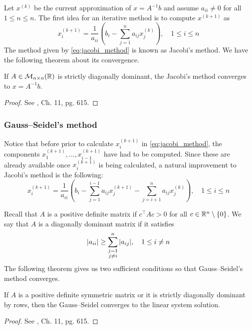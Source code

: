 Let $x^{(k)}$ be the current approximation of $x = A^{-1} b$ and assume $a_{ii}
\neq 0$ for all $1 \leq n \leq n$. The first idea for an iterative method is to
compute $x^{(k+1)}$ as
\begin{equation} \label{eq:jacobi_method}
    x_i^{(k+1)} = 
    \frac{1}{a_{ii}} \left( b_i - \sum_{j=1}^n a_{ij} x_j^{(k)} \right), 
    \quad 1 \leq i \leq n
\end{equation}
The method given by \eqref{eq:jacobi_method} is known as Jacobi's method. We
have the following theorem about its convergence.

\begin{theorem}
    If $A \in \mathcal{M}_{n \times n}(\mathbb{R})$ is strictly diagonally dominant,
    the Jacobi's method converges to $x = A^{-1} b$. 
\end{theorem}
\begin{proof}
    See \cite{golub2013matrix}, Ch. 11, pg. 615.
\end{proof}

\subsubsection{Gauss--Seidel's method}

Notice that before prior to calculate $x_i^{(k+1)}$ in \eqref{eq:jacobi_method},
the components $x_1^{(k+1)}, \ldots, x_{i-1}^{(k+1)}$ have had to be computed.
Since these are already available once $x_i^{(k+1)}$ is being calculated, a
natural improvement to Jacobi's method is the following:
\begin{equation}
    x_i^{(k+1)} = 
    \frac{1}{a_{ii}} \left( b_i - \sum_{j=1}^{i-1} a_{ij} x_j^{(k+1)} - \sum_{j=i+1}^{n} a_{ij} x_j^{(k)} \right), 
    \quad 1 \leq i \leq n
\end{equation}

Recall that $A$ is a positive definite matrix if $c^\top A c > 0$ for all $c \in
\mathbb{R}^n \setminus \{ 0 \}$. We say that $A$ is a diagonally dominant matrix if
it satisfies
\begin{equation}
    \abs{a_{ii}} \geq \sum_{\substack{j = 1 \\ j \neq i}}^n \abs{a_{ij}}, 
    \quad 1 \leq i \neq n
\end{equation}
The following theorem gives us two sufficient conditions so that Gauss--Seidel's
method converges.

\begin{theorem}
    If $A$ is a positive definite symmetric matrix or it is strictly diagonally
    dominant by rows, then the Gauss--Seidel converges to the linear system
    solution.
\end{theorem}
\begin{proof}
    See \cite{golub2013matrix}, Ch. 11, pg. 615.
\end{proof}

